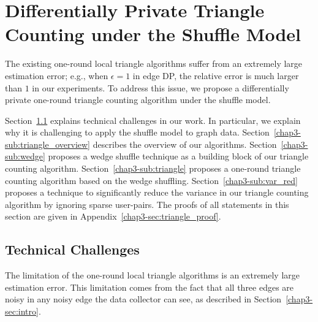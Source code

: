 \section{Differentially Private Triangle Counting under the Shuffle Model}
\label{chap3-sec:triangle}
The existing one-round local triangle algorithms \cite{Imola_USENIX21,Imola_USENIX22,Ye_ICDE20,Ye_TKDE21} suffer from an extremely large estimation error; e.g., when $\epsilon=1$ in edge DP, the relative error is much larger than $1$ in our experiments. 
To address this issue, we propose a differentially private one-round triangle counting algorithm under the shuffle model. 

Section~\ref{chap3-sub:challenges} explains technical challenges in our work. 
In particular, we explain why it is challenging to apply the shuffle model to graph data. 
Section~\ref{chap3-sub:triangle_overview} describes the overview of our algorithms. 
Section~\ref{chap3-sub:wedge} proposes a wedge shuffle technique as a building block of our triangle counting algorithm. 
Section~\ref{chap3-sub:triangle} proposes a one-round triangle counting algorithm based on the wedge shuffling. 
Section~\ref{chap3-sub:var_red} proposes a technique to significantly reduce the variance in our triangle counting algorithm by ignoring sparse user-pairs. 
The proofs of all statements in this section are given in Appendix~\ref{chap3-sec:triangle_proof}. 

\subsection{Technical Challenges}
\label{chap3-sub:challenges}
The limitation of the one-round local triangle algorithms is an extremely large estimation error. 
This limitation comes from the fact that all three edges are noisy in any noisy edge the data collector can see, as described in Section~\ref{chap3-sec:intro}. 

